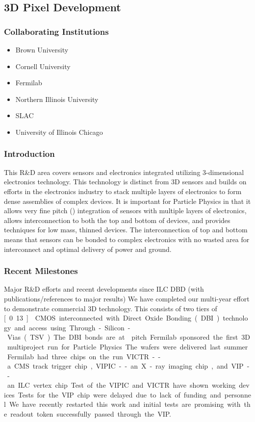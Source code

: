 \subsection{3D Pixel Development}
\subsubsection{Collaborating Institutions}
\begin{itemize}
\item Brown University
\item Cornell University
\item Fermilab
\item Northern Illinois University
\item SLAC
\item University of Illinois Chicago
\end{itemize}
\subsubsection{Introduction}
This R\&D area covers sensors and electronics integrated utilizing 3-dimensional electronics technology.  This technology is distinct from 3D sensors and builds on efforts in the electronics industry to stack multiple layers of electronics to form dense assemblies of complex devices.  It is important for Particle Physics in that it allows very fine pitch (\unit[4]{\micron}) integration of sensors with multiple layers of electronics, allows interconnection to both the top and bottom of devices, and provides techniques for low mass, thinned devices. The interconnection of top and bottom means that sensors can be bonded to complex electronics with no wasted area for interconnect and optimal delivery of power and ground.
\subsubsection{Recent Milestones}
Major R\&D efforts and recent developments since ILC DBD (with publications/references to major results)
We have completed our multi-year effort to demonstrate commercial 3D technology. This consists of two tiers of \unit[0.13]{\micron} CMOS interconnected with Direct Oxide Bonding (DBI) technology and access using Through-Silicon-Vias (TSV). The DBI bonds are at \unit[4]{\micron} pitch. Fermilab sponsored the first 3D multiproject run for Particle Physics. The wafers were delivered last summer. Fermilab had three chips on the run VICTR -- a CMS track trigger chip, VIPIC -- an X-ray imaging chip, and VIP -- an ILC vertex chip. Test of the VIPIC and VICTR have shown working devices.  Tests for the VIP chip were delayed due to lack of funding and personnel.  We have recently restarted this work and initial tests are promising with the readout token successfully passed through the VIP.

